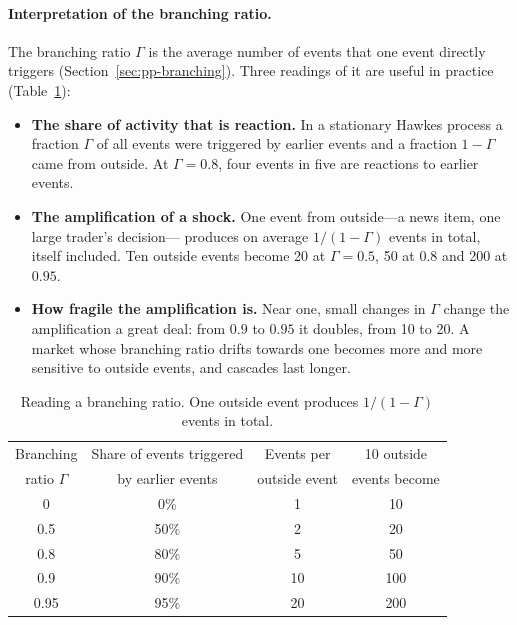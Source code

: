\paragraph{Interpretation of the branching ratio.} The branching ratio $\Gamma$ is the average number of events that one event
directly triggers (Section~\ref{sec:pp-branching}). Three readings of it are useful in practice
(Table~\ref{tab:branching-read}):
\begin{itemize}[leftmargin=1.5em,itemsep=1pt]
\item \textbf{The share of activity that is reaction.} In a stationary Hawkes process a fraction $\Gamma$ of all
  events were triggered by earlier events and a fraction $1-\Gamma$ came from outside. At $\Gamma = 0.8$, four
  events in five are reactions to earlier events.
\item \textbf{The amplification of a shock.} One event from outside---a news item, one large trader's decision---
  produces on average $1/(1-\Gamma)$ events in total, itself included. Ten outside events become 20 at
  $\Gamma = 0.5$, 50 at $0.8$ and 200 at $0.95$.
\item \textbf{How fragile the amplification is.} Near one, small changes in $\Gamma$ change the amplification
  a great deal: from $0.9$ to $0.95$ it doubles, from 10 to 20. A market whose branching ratio drifts towards one
  becomes more and more sensitive to outside events, and cascades last longer.
\end{itemize}

\begin{table}[!htbp]
\centering\footnotesize
\caption{Reading a branching ratio. One outside event produces $1/(1-\Gamma)$ events in total.}
\label{tab:branching-read}
\begin{tabular}{cccc}
\toprule
Branching & Share of events triggered & Events per & 10 outside \\
ratio $\Gamma$ & by earlier events & outside event & events become \\
\midrule
0 & 0\% & 1 & 10 \\
0.5 & 50\% & 2 & 20 \\
0.8 & 80\% & 5 & 50 \\
0.9 & 90\% & 10 & 100 \\
0.95 & 95\% & 20 & 200 \\
\bottomrule
\end{tabular}
\end{table}

